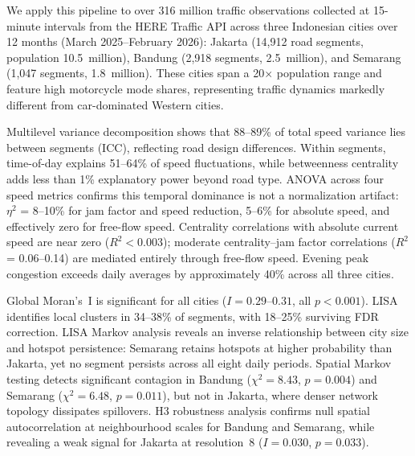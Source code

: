\documentclass[11pt,a4paper]{article}
\begin{document}
We apply this pipeline to over 316 million traffic observations collected at 15-minute intervals from the HERE Traffic API across three Indonesian cities over 12 months (March 2025--February 2026): Jakarta (14,912 road segments, population 10.5~million), Bandung (2,918 segments, 2.5~million), and Semarang (1,047 segments, 1.8~million). These cities span a 20$\times$ population range and feature high motorcycle mode shares, representing traffic dynamics markedly different from car-dominated Western cities.

\medskip
Multilevel variance decomposition shows that 88--89\% of total speed variance lies between segments (ICC), reflecting road design differences. Within segments, time-of-day explains 51--64\% of speed fluctuations, while betweenness centrality adds less than 1\% explanatory power beyond road type. ANOVA across four speed metrics confirms this temporal dominance is not a normalization artifact: $\eta^2$ = 8--10\% for jam factor and speed reduction, 5--6\% for absolute speed, and effectively zero for free-flow speed. Centrality correlations with absolute current speed are near zero ($R^2 < 0.003$); moderate centrality--jam factor correlations ($R^2$ = 0.06--0.14) are mediated entirely through free-flow speed. Evening peak congestion exceeds daily averages by approximately 40\% across all three cities.

Global Moran's~I is significant for all cities ($I = 0.29$--$0.31$, all $p < 0.001$). LISA identifies local clusters in 34--38\% of segments, with 18--25\% surviving FDR correction. LISA Markov analysis reveals an inverse relationship between city size and hotspot persistence: Semarang retains hotspots at higher probability than Jakarta, yet no segment persists across all eight daily periods. Spatial Markov testing detects significant contagion in Bandung ($\chi^2 = 8.43$, $p = 0.004$) and Semarang ($\chi^2 = 6.48$, $p = 0.011$), but not in Jakarta, where denser network topology dissipates spillovers. H3 robustness analysis confirms null spatial autocorrelation at neighbourhood scales for Bandung and Semarang, while revealing a weak signal for Jakarta at resolution~8 ($I = 0.030$, $p = 0.033$).
\end{document}
